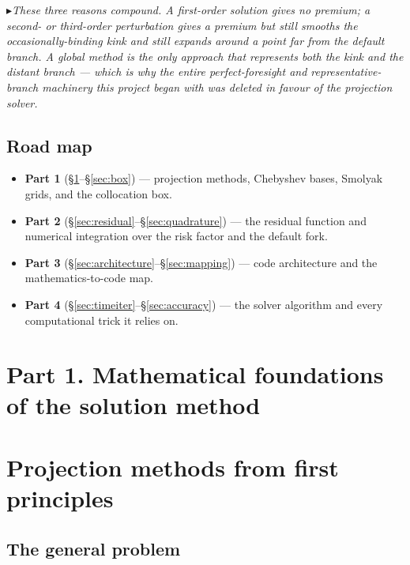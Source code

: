 \documentclass[11pt]{article}
\numberwithin{equation}{section}
\theoremstyle{definition}
\theoremstyle{plain}
\theoremstyle{remark}
\newcommand{\trick}[1]{\par\smallskip\noindent
  \textcolor{notec}{$\blacktriangleright$}\;\emph{#1}\par\smallskip}
\begin{document}
\trick{These three reasons compound. A first-order solution gives no premium; a
second- or third-order perturbation gives a premium but still smooths the
occasionally-binding kink and still expands around a point far from the default
branch. A global method is the only approach that represents both the kink and the
distant branch --- which is why the entire perfect-foresight and
representative-branch machinery this project began with was deleted in favour of the projection
solver.}

\subsection{Road map}

\begin{itemize}
\item \textbf{Part 1} (\S\ref{sec:projection}--\S\ref{sec:box}) --- projection
      methods, Chebyshev bases, Smolyak grids, and the collocation box.
\item \textbf{Part 2} (\S\ref{sec:residual}--\S\ref{sec:quadrature}) --- the residual
      function and numerical integration over the risk factor and the default fork.
\item \textbf{Part 3} (\S\ref{sec:architecture}--\S\ref{sec:mapping}) --- code
      architecture and the mathematics-to-code map.
\item \textbf{Part 4} (\S\ref{sec:timeiter}--\S\ref{sec:accuracy}) --- the solver
      algorithm and every computational trick it relies on.
\end{itemize}

\clearpage
\section*{Part 1. Mathematical foundations of the solution method}

\section{Projection methods from first principles}
\label{sec:projection}

\subsection{The general problem}
\end{document}
